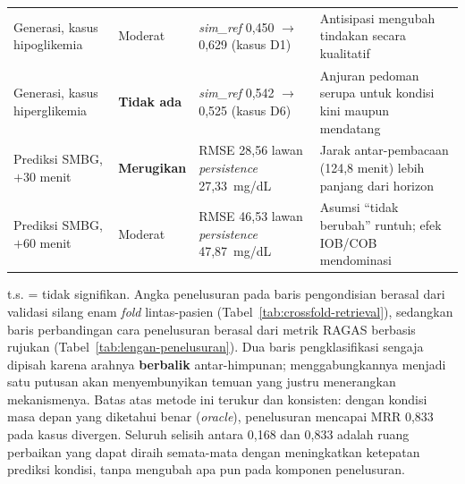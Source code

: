 \begin{table}[p]
\begin{tabularx}{\textwidth}{@{}LlLL@{}}
\midrule
Generasi, kasus hipoglikemia & Moderat & \emph{sim\_ref} 0,450 $\rightarrow$ 0,629 (kasus D1) & Antisipasi mengubah tindakan secara kualitatif \\
\addlinespace
Generasi, kasus hiperglikemia & \textbf{Tidak ada} & \emph{sim\_ref} 0,542 $\rightarrow$ 0,525 (kasus D6) & Anjuran pedoman serupa untuk kondisi kini maupun mendatang \\
\midrule
Prediksi SMBG, $+30$ menit & \textbf{Merugikan} & RMSE 28,56 lawan \emph{persistence} 27,33~mg/dL & Jarak antar-pembacaan (124,8 menit) lebih panjang dari horizon \\
\addlinespace
Prediksi SMBG, $+60$ menit & Moderat & RMSE 46,53 lawan \emph{persistence} 47,87~mg/dL & Asumsi ``tidak berubah'' runtuh; efek IOB/COB mendominasi \\
\bottomrule
\end{tabularx}

\vspace{0.4em}
{\tabnotestyle t.s. = tidak signifikan. Angka penelusuran pada baris pengondisian berasal dari validasi silang enam \emph{fold} lintas-pasien (Tabel~\ref{tab:crossfold-retrieval}), sedangkan baris perbandingan cara penelusuran berasal dari metrik RAGAS berbasis rujukan (Tabel~\ref{tab:lengan-penelusuran}). Dua baris pengklasifikasi sengaja dipisah karena arahnya \textbf{berbalik} antar-himpunan; menggabungkannya menjadi satu putusan akan menyembunyikan temuan yang justru menerangkan mekanismenya. Batas atas metode ini terukur dan konsisten: dengan kondisi masa depan yang diketahui benar (\emph{oracle}), penelusuran mencapai MRR 0,833 pada kasus divergen. Seluruh selisih antara 0,168 dan 0,833 adalah ruang perbaikan yang dapat diraih semata-mata dengan meningkatkan ketepatan prediksi kondisi, tanpa mengubah apa pun pada komponen penelusuran.\par}
\end{table}
